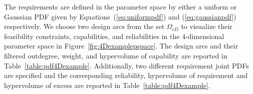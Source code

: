 The requirements are defined in the parameter space by either a uniform or Gaussian \ac{PDF} given by Equations~(\ref{eq:uniformpdf}) and (\ref{eq:gaussianpdf}) respectively. We choose two design arcs from the set $\Omega_{cD}$ to visualize their feasibility constraints, capabilities, and reliabilities in the 4-dimensional parameter space in Figure~\ref{fig:4Dexamplepspace}. The design arcs and their filtered outdegree, weight, and hypervolume of capability are reported in Table~\ref{table:pdf4Dexample}. Additionally, two different requirement joint \acp{PDF} are specified and the corresponding reliability, hypervolume of requirement and hypervolume of excess are reported in Table~\ref{table:pdf4Dexample}.

\newcommand{\cwaa}{0.75cm} %
\newcommand{\cwa}{1.5cm} %
\newcommand{\cwc}{1.5cm} %
\newcommand{\cwd}{1cm} %
\newcommand{\cwe}{1.5cm} %
\newcommand{\cwf}{1.5cm} %
%
%
\newcommand{\cwb}{1.1cm} %
\newcommand{\cwi}{1.1cm} %
\newcommand{\cwj}{1.1cm} %

